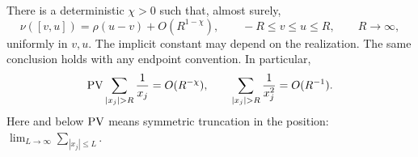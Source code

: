\begin{lemma}\label{lem:discrepancy}
There is a deterministic $\chi>0$ such that, almost surely,
\begin{equation}\label{eq:discrepancy}
 \nu([v,u])=\rho(u-v)+O(R^{1-\chi}),
 \qquad -R\le v\le u\le R,\qquad R\longrightarrow\infty,
\end{equation}
uniformly in $v,u$. The implicit constant may depend on the realization.
The same conclusion holds with any endpoint convention. In particular,
\begin{equation}\label{eq:position-tail-bounds}
 \PV\sum_{|x_j|>R}\frac1{x_j}=O(R^{-\chi}),\qquad
 \sum_{|x_j|>R}\frac1{x_j^2}=O(R^{-1}).
\end{equation}
Here and below $\operatorname{PV}$ means symmetric truncation in the position:
$\lim_{L\to\infty}\sum_{|x_j|\le L}$.
\end{lemma}

